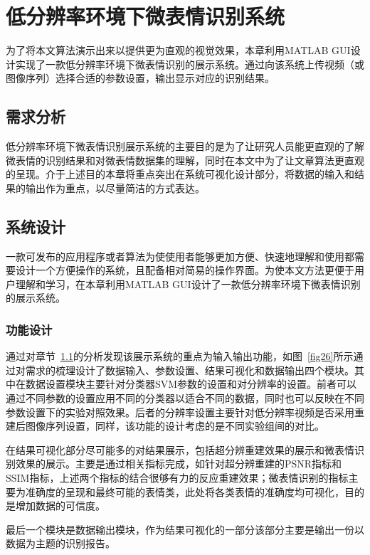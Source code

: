 \chapter{低分辨率环境下微表情识别系统}\label{chap:system}

为了将本文算法演示出来以提供更为直观的视觉效果，本章利用MATLAB GUI设计实现了一款低分辨率环境下微表情识别的展示系统。通过向该系统上传视频（或图像序列）选择合适的参数设置，输出显示对应的识别结果。

\section{需求分析}\label{sec:require}

低分辨率环境下微表情识别展示系统的主要目的是为了让研究人员能更直观的了解微表情的识别结果和对微表情数据集的理解，同时在本文中为了让文章算法更直观的呈现。介于上述目的本章将重点突出在系统可视化设计部分，将数据的输入和结果的输出作为重点，以尽量简洁的方式表达。

\section{系统设计}

一款可发布的应用程序或者算法为使使用者能够更加方便、快速地理解和使用都需要设计一个方便操作的系统，且配备相对简易的操作界面。为使本文方法更便于用户理解和学习，在本章利用MATLAB GUI设计了一款低分辨率环境下微表情识别的展示系统。

\subsection{功能设计}

通过对章节~\ref{sec:require}的分析发现该展示系统的重点为输入输出功能，如图~\ref{fig26}所示通过对需求的梳理设计了数据输入、参数设置、结果可视化和数据输出四个模块。其中在数据设置模块主要针对分类器SVM参数的设置和对分辨率的设置。前者可以通过不同参数的设置应用不同的分类器以适合不同的数据，同时也可以反映在不同参数设置下的实验对照效果。后者的分辨率设置主要针对低分辨率视频是否采用重建后图像序列设置，同样，该功能的设计考虑的是不同实验组间的对比。

在结果可视化部分尽可能多的对结果展示，包括超分辨重建效果的展示和微表情识别效果的展示。主要是通过相关指标完成，如针对超分辨重建的PSNR指标和SSIM指标，上述两个指标的结合很够有力的反应重建效果；微表情识别的指标主要为准确度的呈现和最终可能的表情类，此处将各类表情的准确度均可视化，目的是增加数据的可信度。

最后一个模块是数据输出模块，作为结果可视化的一部分该部分主要是输出一份以数据为主题的识别报告。

